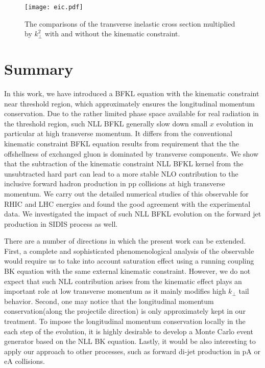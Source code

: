 \documentclass[prd,aps,preprint,tightenlines,nofootinbib,superscriptaddress]{revtex4}
\begin{document}
 
\begin{figure}[h!]\centering
\texttt{[image: eic.pdf]}
\caption{The comparisons of  the transverse inelastic cross section multiplied by $k_\perp^2$ with and without the kinematic constraint.
}
\label{eic}
\end{figure}
 





\section{Summary}

In this work, we have introduced a BFKL equation with the kinematic constraint near threshold region, which  approximately ensures  the longitudinal momentum conservation. Due to the rather limited phase space available for real radiation in the threshold region, such NLL BFKL generally slow down small $x$ evolution  in particular at high transverse momentum. It  differs from the conventional kinematic constraint BFKL equation results from requirement that the the offshellness of exchanged  gluon is dominated by transverse components.    We show that the subtraction of the kinematic constraint NLL BFKL kernel  from the unsubtracted hard part can  lead to a more stable NLO contribution to the inclusive forward hadron production in pp collisions  at high transverse momentum. We carry out  the detailed numerical studies of this observable for RHIC and LHC energies and found the good agreement with the experimental data.  We  investigated the impact of such NLL BFKL  evolution on the forward jet production in SIDIS process as well.


There are a number of directions in which the present work can be extended. First, a complete and sophisticated  phenomenological analysis of the observable would require us to take into account saturation effect using a running coupling BK equation with the same external  kinematic constraint. However, we do not expect that such NLL contribution arises from the kinematic effect plays an important role at low transverse momentum as it mainly modifies high $k_\perp$ tail behavior.   Second, one may notice that the longitudinal momentum conservation(along the projectile direction) is only approximately  kept in our treatment. To impose the longitudinal momentum conservation locally in the each step of the evolution,   it is  highly desirable to develop a Monte Carlo event generator based on the NLL BK equation. Lastly, it would be also interesting to apply our approach to   other processes, such as forward di-jet production in pA or eA collisions. 
\end{document}
